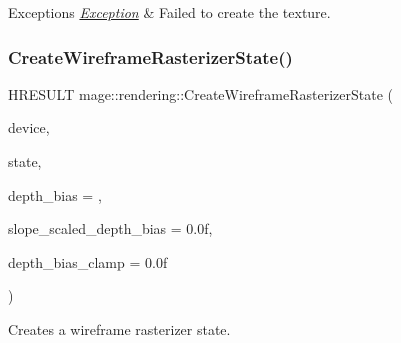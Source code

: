 \begin{DoxyExceptions}{Exceptions}
{\em \mbox{\hyperlink{classmage_1_1_exception}{Exception}}} & Failed to create the texture. \\
\hline
\end{DoxyExceptions}
\mbox{\label{namespacemage_1_1rendering_a268f83e5dd424961bca6b970fd654ce8}} 
\subsubsection{\texorpdfstring{Create\+Wireframe\+Rasterizer\+State()}{CreateWireframeRasterizerState()}}
{\footnotesize\ttfamily H\+R\+E\+S\+U\+LT mage\+::rendering\+::\+Create\+Wireframe\+Rasterizer\+State (\begin{DoxyParamCaption}\item[{I\+D3\+D11\+Device \&}]{device,  }\item[{\mbox{\hyperlink{namespacemage_a8769f9d670d6b585ea306cb1062af94b}{Not\+Null}}$<$ I\+D3\+D11\+Rasterizer\+State $\ast$$\ast$$>$}]{state,  }\item[{\mbox{\hyperlink{namespacemage_a2ef1a005a77358f1825d13fd481b557f}{S32}}}]{depth\+\_\+bias = {},  }\item[{\mbox{\hyperlink{namespacemage_aa97e833b45f06d60a0a9c4fc22ae02c0}{F32}}}]{slope\+\_\+scaled\+\_\+depth\+\_\+bias = {\ttfamily 0.0f},  }\item[{\mbox{\hyperlink{namespacemage_aa97e833b45f06d60a0a9c4fc22ae02c0}{F32}}}]{depth\+\_\+bias\+\_\+clamp = {\ttfamily 0.0f} }\end{DoxyParamCaption})\hspace{0.3cm}{\ttfamily [noexcept]}}

Creates a wireframe rasterizer state.


